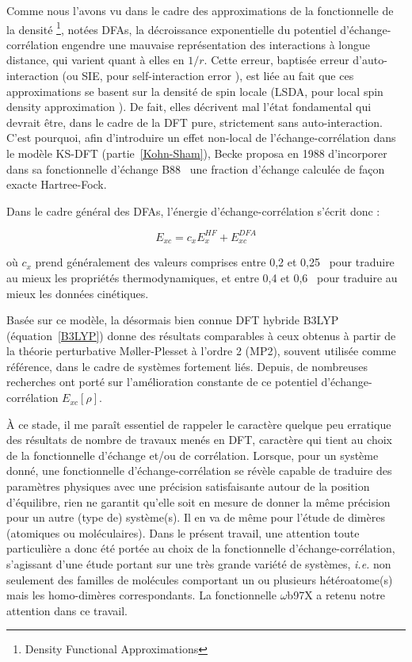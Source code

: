 	Comme nous l'avons vu dans le cadre des approximations de la fonctionnelle de la densité \footnote{\og Density Functional Approximations \fg{} }, notées DFAs, la décroissance exponentielle du potentiel d'échange-corrélation engendre une mauvaise représentation des interactions à longue distance, qui varient quant à elles en $1/r$. Cette erreur, baptisée erreur d'auto-interaction (ou SIE, pour \og self-interaction error \fg{}), est liée au fait que ces approximations se basent sur la densité de spin locale (LSDA, pour \og local spin density approximation \fg{}). De fait, elles décrivent mal l'état fondamental qui devrait être, dans le cadre de la DFT pure, strictement sans auto-interaction.     
	C'est pourquoi, afin d'introduire un effet non-local de l'échange-corrélation dans le modèle KS-DFT (partie~\ref{Kohn-Sham}), Becke proposa en 1988 d'incorporer dans sa fonctionnelle d'échange B88~\cite{becke1988density} une fraction d'échange calculée de façon exacte Hartree-Fock. 
	
	Dans le cadre général des DFAs, l'énergie d'échange-corrélation s'écrit donc :
	
	\begin{equation}
	E_{xc} = c_{x}E_{x}^{HF} + E_{xc}^{DFA}
	\label{xcB88}
	\end{equation}
	
	\noindent où $c_{x}$ prend généralement des valeurs comprises entre 0,2 et 0,25~\cite{becke1993density} pour traduire au mieux les propriétés thermodynamiques, et entre 0,4 et 0,6~\cite{boese2004development} pour traduire au mieux les données cinétiques.
	
	Basée sur ce modèle, la désormais bien connue DFT hybride B3LYP \cite{becke1993density} (équation~\ref{B3LYP}) donne des résultats comparables à ceux obtenus à partir de la théorie perturbative M\o ller-Plesset à l'ordre 2 \cite{moller1934note} (MP2), souvent utilisée comme référence, dans le cadre de systèmes fortement liés. Depuis, de nombreuses recherches ont porté sur l'amélioration constante de ce potentiel d'échange-corrélation $E_{xc}[\rho]$.
	
	À ce stade, il me paraît essentiel de rappeler le caractère quelque peu \og erratique \fg{} des résultats de nombre de travaux menés en DFT, caractère qui tient au choix de la fonctionnelle d'échange et/ou de corrélation. 
	 Lorsque, pour un système donné, une fonctionnelle d’échange-corrélation se révèle capable de traduire des paramètres physiques avec une précision satisfaisante autour de la position d’équilibre, rien ne garantit qu’elle soit en mesure de donner la même précision pour un autre (type de) système(s). Il en va de même pour l’étude de dimères (atomiques ou moléculaires). Dans le présent travail, une attention toute particulière a donc été portée au choix de la fonctionnelle d’échange-corrélation, s'agissant d'une étude portant sur une très grande variété de systèmes, \textit{i.e.} non seulement des familles de molécules comportant un ou plusieurs hétéroatome(s) mais les homo-dimères correspondants. La fonctionnelle $\omega$b97X a retenu notre attention dans ce travail.
	
